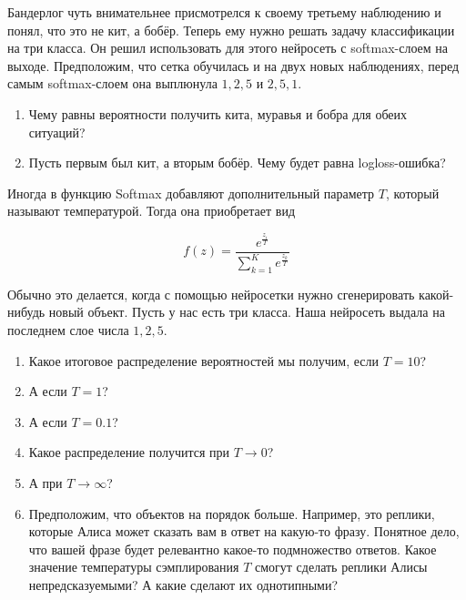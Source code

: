 \documentclass[12pt, a4paper, oneside]{article}
\theoremstyle{plain} %
\theoremstyle{definition}
\begin{document}
\begin{problem}
	Бандерлог чуть внимательнее присмотрелся к своему третьему наблюдению и понял, что это не кит, а бобёр. Теперь ему нужно решать задачу классификации на три класса. Он решил использовать для этого нейросеть с softmax-слоем на выходе.  Предположим, что сетка обучилась и на двух новых наблюдениях, перед самым softmax-слоем она выплюнула $1, 2, 5$ и $2, 5, 1$.
	
	\begin{enumerate}
		\item Чему равны вероятности получить кита, муравья и бобра для обеих ситуаций? 
		\item Пусть первым был кит, а вторым бобёр.  Чему будет равна logloss-ошибка? 
	\end{enumerate}
\end{problem}

\begin{problem}
	Иногда в функцию Softmax добавляют дополнительный параметр $T$, который называют температурой. Тогда она приобретает вид 
	
	\[ 
	f(z) =  \frac{e^{\tfrac{z_i}{T}}}{ \sum_{k=1}^K e^{\tfrac{z_k}{T}}}
	\]

	Обычно это делается, когда с помощью нейросетки нужно сгенерировать какой-нибудь новый объект.  Пусть у нас есть три класса. Наша нейросеть выдала на последнем слое числа $1,2,5$. 

	\begin{enumerate}
		\item  Какое итоговое распределение вероятностей мы получим, если $T = 10$? 
		\item  А если $T = 1$? 
		\item  А если $T = 0.1$? 
		\item  Какое распределение получится при $T \to 0$? 
		\item  А при $T \to \infty$? 
		\item  Предположим, что объектов на порядок больше. Например, это реплики, которые Алиса может сказать вам в ответ на какую-то фразу.  Понятное дело, что вашей фразе будет релевантно какое-то подмножество ответов. Какое значение температуры сэмплирования $T$ смогут сделать реплики Алисы непредсказуемыми? А какие сделают их однотипными? 
	\end{enumerate}
\end{problem}
\end{document}
